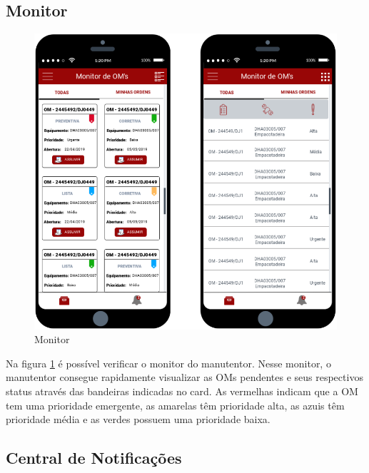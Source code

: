 \newpage
\subsection{Monitor}

\begin{figure}[htb]
	\caption{\label{mobile_monitor}Monitor}
	\begin{center}
		\includegraphics[scale=0.75]{./Figuras/mobile/monitor.png}
	\end{center}
\end{figure}

Na figura \ref{mobile_monitor} é possível verificar o monitor do manutentor. Nesse monitor, o manutentor consegue rapidamente visualizar as OMs pendentes e seus respectivos status através das bandeiras indicadas no card. As  vermelhas indicam que a OM tem uma prioridade emergente, as amarelas têm prioridade alta, as azuis têm prioridade média e as verdes possuem uma prioridade baixa.

\newpage
\subsection{Central de Notificações}

